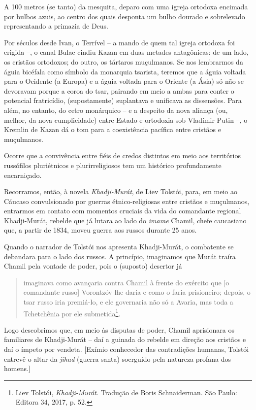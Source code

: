 A 100 metros (se tanto) da mesquita, deparo com uma igreja ortodoxa
encimada por bulbos azuis, ao centro dos quais desponta um bulbo dourado
e sobrelevado representando a primazia de Deus.

Por séculos desde Ivan, o Terrível -- a mando de quem tal igreja
ortodoxa foi erigida --, o canal Bulac cindiu Kazan em duas metades
antagônicas: de um lado, os cristãos ortodoxos; do outro, os tártaros
muçulmanos. Se nos lembrarmos da águia bicéfala como símbolo da
monarquia tsarista, teremos que a águia voltada para o Ocidente (a
Europa) e a águia voltada para o Oriente (a Ásia) só não se devoravam
porque a coroa do tsar, pairando em meio a ambas para conter o potencial
fratricídio, (supostamente) suplantava e unificava as dissensões. Para
além, no entanto, do cetro monárquico -- e a despeito da nova aliança
(ou, melhor, da nova cumplicidade) entre Estado e ortodoxia sob Vladímir
Putin --, o Kremlin de Kazan dá o tom para a coexistência pacífica entre
cristãos e muçulmanos.

Ocorre que a convivência entre fiéis de credos distintos em meio aos
territórios russófilos pluriétnicos e plurirreligiosos tem um histórico
profundamente encarniçado.

Recorramos, então, à novela \emph{Khadji-Murát}, de Liev Tolstói, para,
em meio ao Cáucaso convulsionado por guerras étnico-religiosas entre
cristãos e muçulmanos, entrarmos em contato com momentos cruciais da
vida do comandante regional Khadji-Murát, rebelde que já lutara ao lado
do \emph{imame} Chamil, chefe caucasiano que, a partir de 1834, moveu
guerra aos russos durante 25 anos.

Quando o narrador de Tolstói nos apresenta Khadji-Murát, o combatente se
debandara para o lado dos russos. A princípio, imaginamos que Murát
traíra Chamil pela vontade de poder, pois o (suposto) desertor já

\begin{quote}
imaginava como avançaria contra Chamil à frente do exército que {[}o
comandante russo{]} Vorontzóv lhe daria e como o faria prisioneiro;
depois, o tsar russo iria premiá-lo, e ele governaria não só a Avaria,
mas toda a Tchetchênia por ele submetida\footnote{Liev Tolstói,
  \emph{Khadji-Murát.} Tradução de Boris Schnaiderman. São Paulo:
  Editora 34, 2017, p. 52.}.
\end{quote}

Logo descobrimos que, em meio às disputas de poder, Chamil aprisionara
os familiares de Khadji-Murát -- daí a guinada do rebelde em direção aos
cristãos e daí o ímpeto por vendeta. {[}Exímio conhecedor das
contradições humanas, Tolstói entrevê o altar da \emph{jihad} (guerra
santa) soerguido pela natureza profana dos homens.{]}

